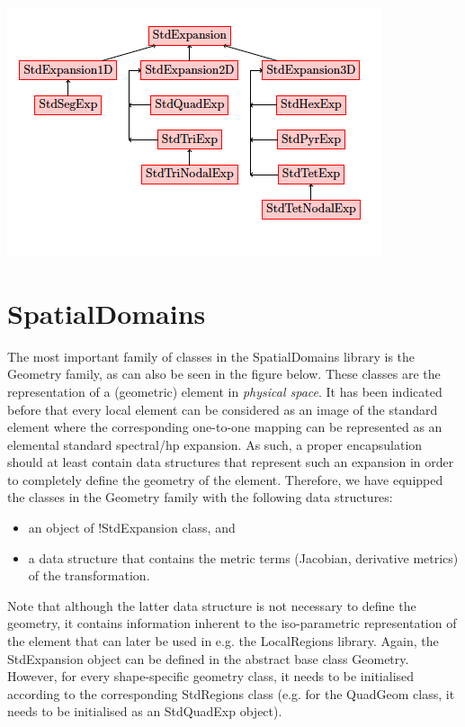 \begin{center}
\includegraphics{img/StdRegions.png}
\end{center}

\section{SpatialDomains}
The most important family of classes in the SpatialDomains library is the 
Geometry family, as can also be seen in the figure below. These classes are the
representation of a (geometric) element in \emph{physical space}. It has been
indicated before that every local element can be considered as an image of the 
standard element where the corresponding one-to-one mapping can be represented 
as an elemental standard spectral/hp expansion. As such, a proper encapsulation
should at least contain data structures that represent such an expansion in 
order to completely define the geometry of the element. Therefore, we have 
equipped the classes in the Geometry family with the following data structures:

\begin{itemize}
\item an object of !StdExpansion class, and
\item a data structure that contains the metric terms (Jacobian, derivative
  metrics) of the transformation.
\end{itemize}

Note that although the latter data structure is not necessary to define the 
geometry, it contains information inherent to the iso-parametric representation
of the element that can later be used in e.g. the LocalRegions library. Again,
the StdExpansion object can be defined in the abstract base class Geometry. 
However, for every shape-specific geometry class, it needs to be initialised 
according to the corresponding StdRegions class (e.g. for the QuadGeom class, 
it needs to be initialised as an StdQuadExp object).

